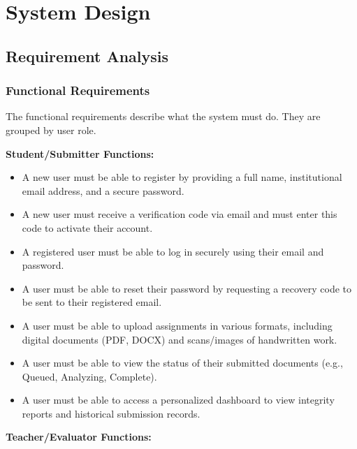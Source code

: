 \documentclass[12pt, a4paper]{report}
\numberwithin{equation}{chapter}
\begin{document}
\chapter{System Design}

\section{Requirement Analysis}

\subsection{Functional Requirements}

The functional requirements describe what the system must do. They are grouped by user role.

\textbf{Student/Submitter Functions:}

\begin{itemize}

\item A new user must be able to register by providing a full name, institutional email address, and a secure password.

\item A new user must receive a verification code via email and must enter this code to activate their account.

\item A registered user must be able to log in securely using their email and password.

\item A user must be able to reset their password by requesting a recovery code to be sent to their registered email.

\item A user must be able to upload assignments in various formats, including digital documents (PDF, DOCX) and scans/images of handwritten work.

\item A user must be able to view the status of their submitted documents (e.g., Queued, Analyzing, Complete).

\item A user must be able to access a personalized dashboard to view integrity reports and historical submission records.

\end{itemize}

\textbf{Teacher/Evaluator Functions:}
\end{document}
